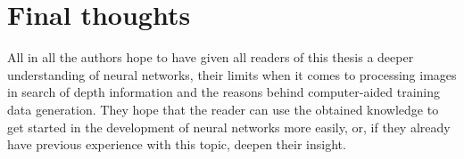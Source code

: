 \section{Final thoughts}

All in all the authors hope to have given all readers of this thesis a deeper understanding of neural networks, their limits when it comes to processing images in search of depth information and the reasons behind computer-aided training data generation. They hope that the reader can use the obtained knowledge to get started in the development of neural networks more easily, or, if they already have previous experience with this topic, deepen their insight.

\filbreak